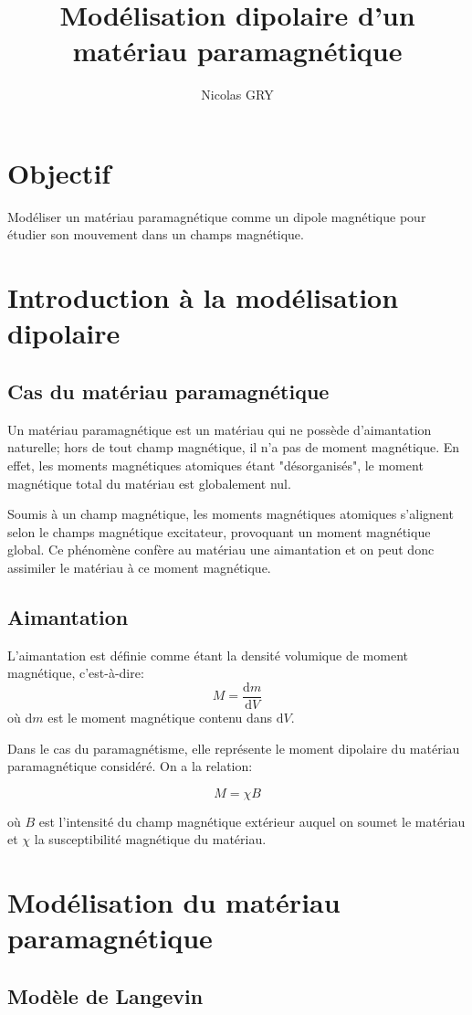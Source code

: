 \documentclass{article}
\author{Nicolas GRY}
\title{Modélisation dipolaire d'un matériau paramagnétique}
\begin{document}
\maketitle
\section{Objectif}
Modéliser un matériau paramagnétique comme un dipole magnétique pour étudier son mouvement dans un champs magnétique.

\section{Introduction à la modélisation dipolaire}
\subsection{Cas du matériau paramagnétique}
Un matériau paramagnétique est un matériau qui ne possède d'aimantation naturelle; hors de tout champ magnétique, il n'a pas de moment magnétique. En effet, les moments magnétiques atomiques étant "désorganisés", le moment magnétique total du matériau est globalement nul.

Soumis à un champ magnétique, les moments magnétiques atomiques s'alignent selon le champs magnétique excitateur, provoquant un moment magnétique global. Ce phénomène confère au matériau une aimantation et on peut donc assimiler le matériau à ce moment magnétique.

\subsection{Aimantation}
L'aimantation est définie comme étant la densité volumique de moment magnétique, c'est-à-dire: $$M = \frac{\mathrm{d}m}{\mathrm{d}V}$$
où $\mathrm{d}m$ est le moment magnétique contenu dans $\mathrm{d}V$.

Dans le cas du paramagnétisme, elle représente le moment dipolaire du matériau paramagnétique considéré. On a la relation:

$$M = \chi B$$

où $B$ est l'intensité du champ magnétique extérieur auquel on soumet le matériau et $\chi$ la susceptibilité magnétique du matériau.

\section{Modélisation du matériau paramagnétique}
\subsection{Modèle de Langevin}
\end{document}
